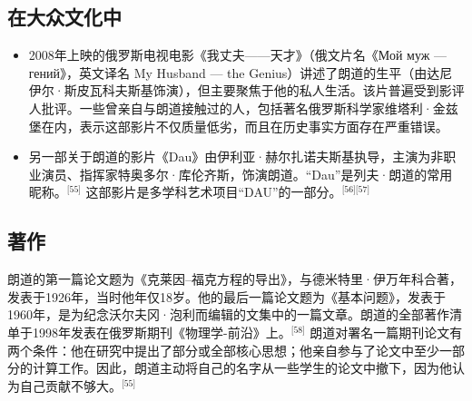 \subsection{在大众文化中}
\begin{itemize}
\item 2008年上映的俄罗斯电视电影《我丈夫——天才》（俄文片名《Мой муж — гений》，英文译名 My Husband — the Genius）讲述了朗道的生平（由达尼伊尔·斯皮瓦科夫斯基饰演），但主要聚焦于他的私人生活。该片普遍受到影评人批评。一些曾亲自与朗道接触过的人，包括著名俄罗斯科学家维塔利·金兹堡在内，表示这部影片不仅质量低劣，而且在历史事实方面存在严重错误。
\item 另一部关于朗道的影片《Dau》由伊利亚·赫尔扎诺夫斯基执导，主演为非职业演员、指挥家特奥多尔·库伦齐斯，饰演朗道。“Dau”是列夫·朗道的常用昵称。\(^\text{[55]}\)
这部影片是多学科艺术项目“DAU”的一部分。\(^\text{[56][57]}\)
\end{itemize}
\subsection{著作}
朗道的第一篇论文题为《克莱因–福克方程的导出》，与德米特里·伊万年科合著，发表于1926年，当时他年仅18岁。他的最后一篇论文题为《基本问题》，发表于1960年，是为纪念沃尔夫冈·泡利而编辑的文集中的一篇文章。朗道的全部著作清单于1998年发表在俄罗斯期刊《物理学-前沿》上。\(^\text{[58]}\)
朗道对署名一篇期刊论文有两个条件：他在研究中提出了部分或全部核心思想；他亲自参与了论文中至少一部分的计算工作。因此，朗道主动将自己的名字从一些学生的论文中撤下，因为他认为自己贡献不够大。\(^\text{[55]}\)
